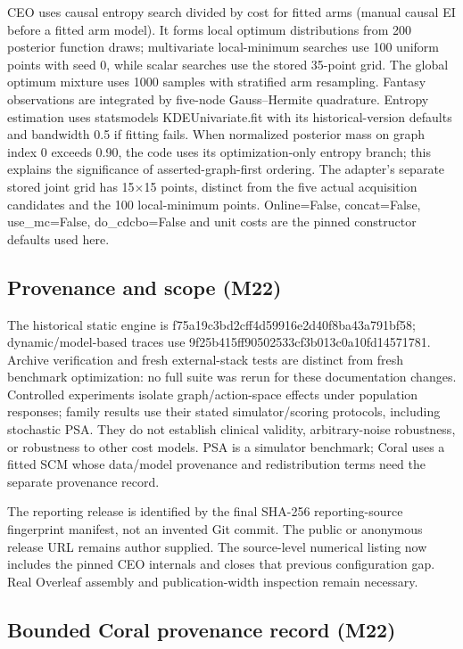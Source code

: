 CEO uses causal entropy search divided by cost for fitted arms (manual causal EI before a fitted arm model). It forms local optimum distributions from 200 posterior function draws; multivariate local-minimum searches use 100 uniform points with seed 0, while scalar searches use the stored 35-point grid. The global optimum mixture uses 1000 samples with stratified arm resampling. Fantasy observations are integrated by five-node Gauss--Hermite quadrature. Entropy estimation uses statsmodels KDEUnivariate.fit with its historical-version defaults and bandwidth 0.5 if fitting fails. When normalized posterior mass on graph index 0 exceeds 0.90, the code uses its optimization-only entropy branch; this explains the significance of asserted-graph-first ordering. The adapter's separate stored joint grid has 15\ensuremath{\times}15 points, distinct from the five actual acquisition candidates and the 100 local-minimum points. Online=False, concat=False, use\_mc=False, do\_cdcbo=False and unit costs are the pinned constructor defaults used here.

\subsection*{Provenance and scope (M22)}

The historical static engine is f75a19c3bd2cff4d59916e2d40f8ba43a791bf58; dynamic/model-based traces use 9f25b415ff90502533cf3b013c0a10fd14571781. Archive verification and fresh external-stack tests are distinct from fresh benchmark optimization: no full suite was rerun for these documentation changes. Controlled experiments isolate graph/action-space effects under population responses; family results use their stated simulator/scoring protocols, including stochastic PSA. They do not establish clinical validity, arbitrary-noise robustness, or robustness to other cost models. PSA is a simulator benchmark; Coral uses a fitted SCM whose data/model provenance and redistribution terms need the separate provenance record.

The reporting release is identified by the final SHA-256 reporting-source fingerprint manifest, not an invented Git commit. The public or anonymous release URL remains author supplied. The source-level numerical listing now includes the pinned CEO internals and closes that previous configuration gap. Real Overleaf assembly and publication-width inspection remain necessary.

\subsection*{Bounded Coral provenance record (M22)}

